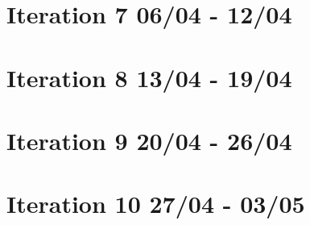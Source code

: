 \section{Iteration 7 06/04 - 12/04}



\section{Iteration 8 13/04 - 19/04}



\section{Iteration 9 20/04 - 26/04}



\section{Iteration 10 27/04 - 03/05}

